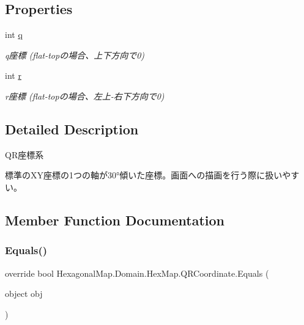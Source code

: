 \subsection*{Properties}
\begin{DoxyCompactItemize}
\item 
int \mbox{\hyperlink{struct_hexagonal_map_1_1_domain_1_1_hex_map_1_1_q_r_coordinate_a2a72acf6695756016491fed0cb909278}{q}}
\begin{DoxyCompactList}\small\item\em q座標 (flat-\/topの場合、上下方向で0) \end{DoxyCompactList}\item 
int \mbox{\hyperlink{struct_hexagonal_map_1_1_domain_1_1_hex_map_1_1_q_r_coordinate_a8e28e052a706b934419932f039c3b973}{r}}
\begin{DoxyCompactList}\small\item\em r座標 (flat-\/topの場合、左上-\/右下方向で0) \end{DoxyCompactList}\end{DoxyCompactItemize}


\subsection{Detailed Description}
Q\+R座標系 

標準の\+X\+Y座標の1つの軸が30°傾いた座標。画面への描画を行う際に扱いやすい。

\subsection{Member Function Documentation}
\mbox{\label{struct_hexagonal_map_1_1_domain_1_1_hex_map_1_1_q_r_coordinate_a82851923eac2c88beeac70d9117e5cc0}} 
\subsubsection{\texorpdfstring{Equals()}{Equals()}}
{\footnotesize\ttfamily override bool Hexagonal\+Map.\+Domain.\+Hex\+Map.\+Q\+R\+Coordinate.\+Equals (\begin{DoxyParamCaption}\item[{object}]{obj }\end{DoxyParamCaption})\hspace{0.3cm}{\ttfamily [inline]}}



